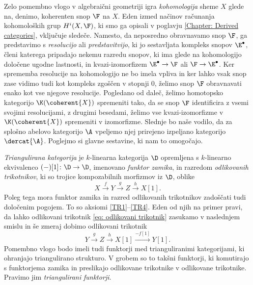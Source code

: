 Zelo pomembno vlogo v algebraični geometriji igra \emph{kohomologija} sheme $X$ glede na, denimo, koherenten snop $\F$ na $X$. Eden izmed načinov računanja kohomoloških grup $H^i(X, \F)$, ki smo ga opisali v poglavju \ref{Chapter: Derived categories}, vključuje sledeče. 
Namesto, da 
neposredno obravnavamo snop $\F$, ga predstavimo s \ti \emph{resolucijo} ali \emph{predstavitvijo}, ki jo sestavljata kompleks snopov $\E^\bullet$, členi katerega pripadajo nekemu razredu snopov, ki ima glede na kohomologijo določene ugodne lastnosti, in kvazi-izomorfizem $\E^\bullet \to \F$ ali $\F \to \E^\bullet$. Ker sprememba resolucije na kohomologijo ne bo imela vpliva in ker lahko vsak snop zase vidimo tudi kot kompleks zgoščen v stopnji $0$, želimo snop $\F$ obravnavati enako kot vse njegove resolucije. 
Pogledano od daleč, želimo homotopsko kategorijo $\K(\coherent{X})$ spremeniti tako, da se snop $\F$ identificira z vsemi svojimi resolucijami, \oz z drugimi besedami, želimo vse kvazi-izomorfizme v $\K(\coherent{X})$ spremeniti v izomorfizme. Slednje bo naše vodilo, da za splošno abelovo kategorijo $\A$ vpeljemo njej prirejeno izpeljano kategorijo $\dercat{\A}$. Poglejmo si glavne sestavine, ki nam to omogočajo. 



\emph{Triangulirana kategorija} je $k$-linearna kategorija $\D$ opremljena s $k$-linearno ekvivalenco $(-)[1] \colon \D \to \D$, imenovano \emph{funktor zamika}, in razredom \emph{odlikovanih trikotnikov}, ki so trojice kompozabilnih morfizmov iz $\D$, oblike
\begin{equation}
    \label{eq: odlikovani trikotnik}
    X\xrightarrow{\ f \ } Y \xrightarrow{\ g \ } Z \xrightarrow{\ h \ } X[1].
\end{equation}
Poleg tega mora funktor zamika in razred odlikovanih trikotnikov zadoščati tudi določenim pogojem. To so aksiomi \ref{TR1}--\ref{TR4}. Eden od njih na primer pravi, da lahko odlikovani trikotnik \eqref{eq: odlikovani trikotnik} zasukamo v naslednjem smislu in še zmeraj dobimo odlikovani trikotnik
\[
    Y \xrightarrow{\ g \ } Z \xrightarrow{\ h \ } X[1] \xrightarrow{-f[1]} Y[1].
\]
Pomembno vlogo bodo imeli tudi funktorji med trianguliranimi kategorijami, ki ohranjajo triangulirano strukturo. V grobem so to takšni funktorji, ki komutirajo s funktorjema zamika in preslikajo odlikovane trikotnike v odlikovane trikotnike. Pravimo jim \emph{triangulirani funktorji}.


